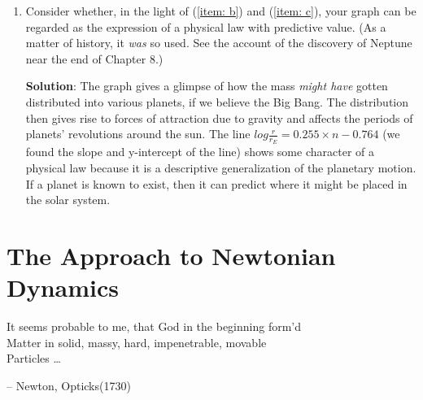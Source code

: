 \documentclass[12pt,a4paper]{book}
\begin{document}
{\begin{enumerate}
    \item Consider whether, in the light of (\ref{item: b}) and (\ref{item: c}), your graph can be regarded as the expression of a physical law with predictive value. (As a matter of history, it \emph{was} so used. See the account of the discovery of Neptune near the end of Chapter 8.) 

        \textbf{Solution}: The graph gives a glimpse of how the mass \emph{might have} gotten distributed into various planets, if we believe the Big Bang. The distribution then gives rise to forces of attraction due to gravity and affects the periods of planets' revolutions around the sun. The line $log \frac{r}{r_E} = 0.255\times n - 0.764$ (we found the slope and y-intercept of the line) shows some character of a physical law because it is a descriptive generalization of the planetary motion. If a planet is known to exist, then it can predict where it might be placed in the solar system.
    \end{enumerate}
}


\pagebreak

    \part{ The Approach to Newtonian Dynamics }

\epigraph
{
    It seems probable to me, that God in the beginning form'd \\
    Matter in solid, massy, hard, impenetrable, movable \\
    Particles \dots
}
{
    -- Newton, Opticks(1730)
}


\pagebreak
\end{document}
